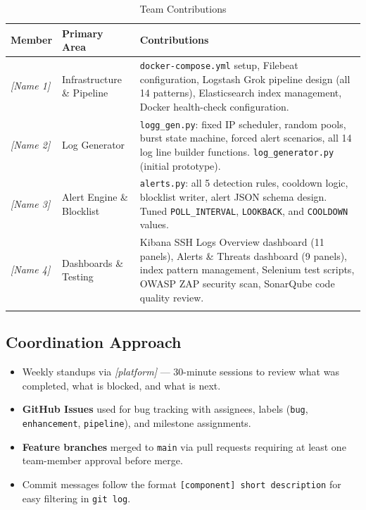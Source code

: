 \documentclass[12pt,a4paper]{article}
\newcommand{\file}[1]{\texttt{\color{accent}#1}}
\begin{document}
\begin{longtable}{p{2.8cm}p{4cm}p{6.5cm}}
  \toprule
  \textbf{Member} & \textbf{Primary Area} & \textbf{Contributions} \\
  \midrule\endhead
  \textit{[Name 1]} & Infrastructure \& Pipeline &
    \file{docker-compose.yml} setup, Filebeat configuration, Logstash Grok
    pipeline design (all 14 patterns), Elasticsearch index management,
    Docker health-check configuration. \\
  \midrule
  \textit{[Name 2]} & Log Generator &
    \file{logg\_gen.py}: fixed IP scheduler, random pools, burst state machine,
    forced alert scenarios, all 14 log line builder functions.
    \file{log\_generator.py} (initial prototype). \\
  \midrule
  \textit{[Name 3]} & Alert Engine \& Blocklist &
    \file{alerts.py}: all 5 detection rules, cooldown logic, blocklist writer,
    alert JSON schema design. Tuned \texttt{POLL\_INTERVAL},
    \texttt{LOOKBACK}, and \texttt{COOLDOWN} values. \\
  \midrule
  \textit{[Name 4]} & Dashboards \& Testing &
    Kibana SSH Logs Overview dashboard (11 panels), Alerts \& Threats dashboard
    (9 panels), index pattern management, Selenium test scripts, OWASP ZAP
    security scan, SonarQube code quality review. \\
  \bottomrule
  \caption{Team Contributions}
\end{longtable}

\subsection*{Coordination Approach}

\begin{itemize}[leftmargin=2em]
  \item Weekly standups via \textit{[platform]} — 30-minute sessions to
        review what was completed, what is blocked, and what is next.
  \item \textbf{GitHub Issues} used for bug tracking with assignees, labels
        (\texttt{bug}, \texttt{enhancement}, \texttt{pipeline}), and
        milestone assignments.
  \item \textbf{Feature branches} merged to \texttt{main} via pull requests
        requiring at least one team-member approval before merge.
  \item Commit messages follow the format
        \texttt{[component] short description} for easy filtering in
        \texttt{git log}.
\end{itemize}
\end{document}
